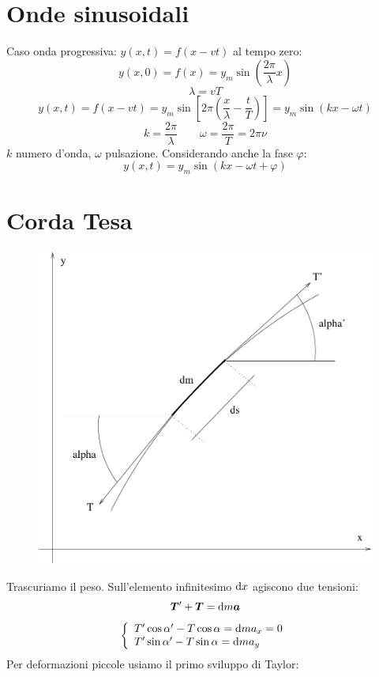 \section{Onde sinusoidali}
Caso onda progressiva: $y(x,t)=f(x-vt)$
al tempo zero:
$$y(x,0)=f(x)=y_m\sin\left(\frac{2\pi}{\lambda} x\right)$$
$$\lambda=vT$$
$$y(x,t)=f(x-vt)=y_m\sin\left[2\pi\left(\frac{x}{\lambda}-\frac{t}{T}\right)\right]=y_m\sin\left(kx-\omega t\right)$$
$$k=\frac{2\pi}{\lambda}\qquad \omega=\frac{2\pi}{T}=2\pi\nu$$
$k$ numero d'onda, $\omega$ pulsazione. Considerando anche la fase $\varphi$:
$$y(x,t)=y_m\sin\left(kx-\omega t+\varphi\right)$$
\section{Corda Tesa}
\begin{figure}[htbp]
   \centering
   \includegraphics[scale=0.4]{immagini/fisica1/Onde_Corda}
\end{figure}
Trascuriamo il peso. Sull'elemento infinitesimo $\mathrm{d} x$ agiscono due tensioni:
$$\boldsymbol{T}'+\boldsymbol{T}=\mathrm{d} m \boldsymbol{a}$$
$$\left\{\begin{array}{l}
T'\cos\alpha'-T\cos\alpha=\mathrm{d} m a_x=0\\
T'\sin\alpha'-T\sin\alpha=\mathrm{d} m a_y\\
\end{array}\right.$$
Per deformazioni piccole usiamo il primo sviluppo di Taylor:
